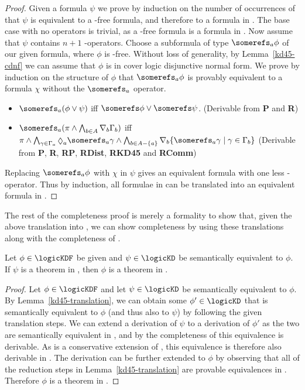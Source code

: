 \begin{proof}
Given a formula $\psi$ we prove by induction on the number of occurrences of
\somerefs{} that $\psi$ is equivalent to a \somerefs-free formula, and
therefore to a formula in \logicKD{}. The base case with no \somerefs operators
is trivial, as a \somerefs-free formula is a formula in \logicKD{}. Now assume
that $\psi$ contains $n + 1$ \somerefs-operators. Choose a subformula of type
$\somerefs_a \phi$ of our given formula, where $\phi$ is \somerefs-free. Without
loss of generality, by Lemma~\ref{kd45-cdnf} we can assume that $\phi$ is in
cover logic disjunctive normal form.  We prove by induction on the structure of
$\phi$ that $\somerefs_a \phi$ is provably equivalent to a formula $\chi$ without
the $\somerefs_a$ operator.

\begin{itemize}
\item $\somerefs_a (\phi \lor \psi)$ iff $\somerefs \phi \lor \somerefs \psi$.
(Derivable from {\bf P} and {\bf R})
\item $\somerefs_a (\pi \land \bigwedge_{b \in A} \covers_b \Gamma_b)$ iff
$\pi \land \bigwedge_{\gamma \in \Gamma_a} \suspects_a \somerefs_a \gamma \land
\bigwedge_{b \in A - \{a\}} \covers_b \{\somerefs_a \gamma \mid \gamma \in
\Gamma_b\}$ (Derivable from {\bf P}, {\bf R}, {\bf RP}, {\bf RDist}, {\bf
RKD45} and {\bf RComm})
\end{itemize}

Replacing $\somerefs_a \phi$ with $\chi$ in $\psi$ gives an equivalent formula
with one less \somerefs-operator. Thus by induction, all formulae in
\logicKDF{} can be translated into an equivalent formula in
\logicKD{}.
\end{proof}

The rest of the completeness proof is merely a formality to show that, given the
above translation into \logicKD{}, we can show completeness by using these
translations along with the completeness of \logicKD{}.

\begin{corollary}\label{kd45-derivable}
Let $\phi \in \logicKDF$ be given and $\psi \in \logicKD$ be semantically
equivalent to $\phi$.  If $\psi$ is a theorem in \logicKD{}, then $\phi$ is a
theorem in \axiomKDF{}.
\end{corollary}

\begin{proof}
Let $\phi \in \logicKDF$ and let $\psi \in \logicKD$ be semantically equivalent to
$\phi$. By Lemma~\ref{kd45-translation}, we can obtain some $\phi' \in \logicKD$
that is semantically equivalent to $\phi$ (and thus also to $\psi$) by following
the given translation steps. We can extend a derivation of $\psi$ to a
derivation of $\phi'$ as the two are semantically equivalent in \logicKD{}, and by
the completeness of \logicKD{} this equivalence is derivable. As \axiomKDF{} is a
conservative extension of \logicKD{}, this equivalence is therefore also derivable
in \axiomKDF{}. The derivation can be further extended to $\phi$ by observing that all
of the reduction steps in Lemma~\ref{kd45-translation} are provable equivalences
in \axiomKDF{}. Therefore $\phi$ is a theorem in \axiomKDF{}.
\end{proof}

